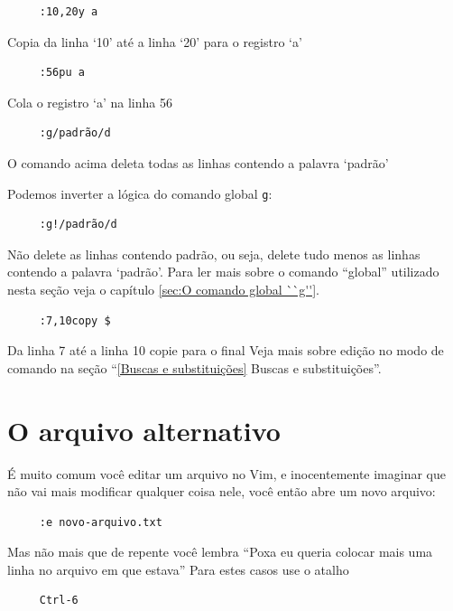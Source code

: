 \documentclass[10pt,a4paper,openany]{book}
\begin{document}
\begin{verbatim}
     :10,20y a
\end{verbatim}

Copia da linha `10' até a linha `20' para o registro `a'

\begin{verbatim}
     :56pu a
\end{verbatim}

Cola o registro `a' na linha 56

\begin{verbatim}
     :g/padrão/d
\end{verbatim}

O comando acima deleta todas as linhas contendo a palavra `padrão'

Podemos inverter a lógica do comando global \verb+g+:

\begin{verbatim}
     :g!/padrão/d
\end{verbatim}


Não delete as linhas contendo padrão, ou seja, delete tudo menos as linhas
contendo a palavra `padrão'. Para ler mais sobre o comando ``global'' utilizado 
nesta seção veja o capítulo \ref{sec:O comando global ``g''}.

\begin{verbatim}
     :7,10copy $
\end{verbatim}

Da linha 7 até a linha 10 copie para o final
Veja mais sobre edição no modo de comando na seção ``\ref{Buscas e
substituições} Buscas e substituições''.

\section{O arquivo alternativo}
\label{O arquivo alternativo}

É muito comum você editar um arquivo no Vim, e inocentemente imaginar
que não vai mais modificar qualquer coisa nele, você então abre um
novo arquivo:

\begin{verbatim}
     :e novo-arquivo.txt
\end{verbatim}

Mas não mais que de repente você lembra ``Poxa eu queria colocar mais
uma linha no arquivo em que estava'' Para estes casos use o atalho

\begin{verbatim}
     Ctrl-6
\end{verbatim}
\end{document}
